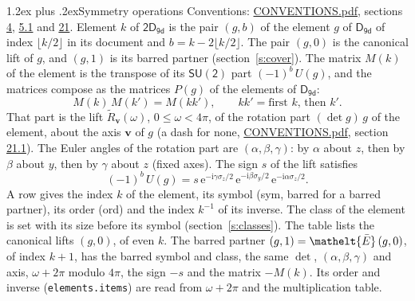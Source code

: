 \documentclass[10pt,a4paper]{article}
\makeatletter
\renewcommand\section{\@startsection{section}{1}{\z@}{-3ex plus -1ex minus -.2ex}%
  {1.2ex plus .2ex}{\normalfont\large\sffamily\bfseries\color{parttitle}}}
\numberwithin{equation}{section}
\newcommand{\eltfont}[1]{{\let\sigma\eltsigma\mathelt{#1}}}
\newcommand{\grp}[1]{\mathsf{#1}}
\newcommand{\elt}[1]{\eltfont{#1}}
\newcommand{\vv}{\mathbf{v}}
\newcommand{\iunit}{\mathrm{i}}
\newcommand{\expe}{\mathrm{e}}
\newcommand{\barred}[1]{\bar{#1}}
\newcommand{\lift}[1]{\tilde{#1}}
\newcommand{\pauli}[1]{\sigma_{#1}}
\makeatother
\begin{document}
\section{Symmetry operations}\label{s:elements}
Conventions: \href{../../CONVENTIONS.pdf}{CONVENTIONS.pdf}, sections \href{../../../rotation/CONVENTIONS.pdf\#conv.4}{4}, \href{../../../rotation/CONVENTIONS.pdf\#conv.5.1}{5.1} and \href{../../CONVENTIONS.pdf\#conv.21}{21}.
\leavevmode\label{n:index.element}\label{n:element.g}Element $k$ of $\grp{2D_{9d}}$ is the pair $(g, b)$ of the element $g$ of \href{../../../rotation/data/pdf/D9d.pdf}{$\grp{D_{9d}}$} of index $\lfloor k/2\rfloor$ in its document and $b = k - 2\lfloor k/2\rfloor$. The pair $(g, 0)$ is the canonical lift of $g$, and $(g, 1)$ is its barred partner (section~\ref{s:cover}). \label{n:matrix.element.pin}\label{n:matrix.element}The matrix $M(k)$ of the element is the transpose of its $\grp{SU(2)}$ part $(-1)^{b}\,U(g)$, and the matrices compose as the matrices $P(g)$ of the elements of $\grp{D_{9d}}$:
\begin{equation}\label{e:mprod}M(k)\,M(k') = M(kk'),\qquad kk' = \text{first } k\text{, then } k'.\end{equation}
\leavevmode\label{n:angle.omega}\label{n:vector.axis}\label{n:vector.pole}That part is the lift $\lift{R}_{\vv}(\omega)$, $0 \le \omega < 4\pi$, of the rotation part $(\det g)\,g$ of the element, about the axis $\vv$ of $g$ (a dash for none, \href{../../CONVENTIONS.pdf}{CONVENTIONS.pdf}, section \href{../../CONVENTIONS.pdf\#conv.21.1}{21.1}). \label{n:angle.euler.alpha}\label{n:angle.euler.beta}\label{n:angle.euler.gamma}\label{n:vector.coordinates}The Euler angles of the rotation part are $(\alpha,\beta,\gamma)$: by $\alpha$ about $z$, then by $\beta$ about $y$, then by $\gamma$ about $z$ (fixed axes). \label{n:local.euler.sign}The sign $s$ of the lift satisfies
\begin{equation}\label{e:euler}(-1)^{b}\,U(g) = s\,\expe^{-\iunit\gamma\pauli{z}/2}\,\expe^{-\iunit\beta\pauli{y}/2}\,\expe^{-\iunit\alpha\pauli{z}/2}.\end{equation}
\leavevmode\label{n:index.element.inverse}\label{n:head.sym}\label{n:head.ord}A row gives the index $k$ of the element, its symbol (sym, barred for a barred partner), its order (ord) and the index $k^{-1}$ of its inverse. \label{n:head.class}The class of the element is set with its size before its symbol (section~\ref{s:classes}).
The table lists the canonical lifts $(g, 0)$, of even $k$. The barred partner $(g, 1) = \elt{\barred{E}}\,(g, 0)$, of index $k + 1$, has the barred symbol and class, the same $\det$, $(\alpha,\beta,\gamma)$ and axis, $\omega + 2\pi$ modulo $4\pi$, the sign $-s$ and the matrix $-M(k)$. Its order and inverse (\texttt{elements.items}) are read from $\omega + 2\pi$ and the multiplication table.
\end{document}
